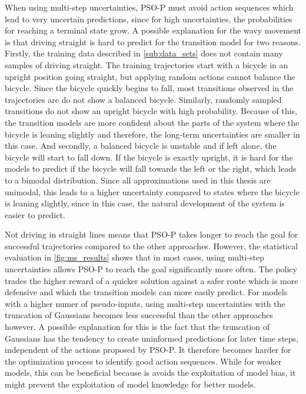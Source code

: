 When using multi-step uncertainties, PSO-P must avoid action sequences which lead to very uncertain predictions, since for high uncertainties, the probabilities for reaching a terminal state grow.
A possible explanation for the wavy movement is that driving straight is hard to predict for the transition model for two reasons.
Firstly, the training data described in \cref{sub:data_sets} does not contain many samples of driving straight.
The training trajectories start with a bicycle in an upright position going straight, but applying random actions cannot balance the bicycle.
Since the bicycle quickly begins to fall, most transitions observed in the trajectories are do not show a balanced bicycle.
Similarly, randomly sampled transitions do not show an upright bicycle with high probability.
Because of this, the transition models are more confident about the parts of the system where the bicycle is leaning slightly and therefore, the long-term uncertainties are smaller in this case.
And secondly, a balanced bicycle is unstable and if left alone, the bicycle will start to fall down.
If the bicycle is exactly upright, it is hard for the models to predict if the bicycle will fall towards the left or the right, which leads to a bimodal distribution.
Since all approximations used in this thesis are unimodal, this leads to a higher uncertainty compared to states where the bicycle is leaning slightly, since in this case, the natural development of the system is easier to predict.

Not driving in straight lines means that PSO-P takes longer to reach the goal for successful trajectories compared to the other approaches.
However, the statistical evaluation in \cref{fig:ms_results} shows that in most cases, using multi-step uncertainties allows PSO-P to reach the goal significantly more often.
The policy trades the higher reward of a quicker solution against a safer route which is more defensive and which the transition models can more easily predict.
For models with a higher numer of pseudo-inputs, using multi-step uncertainties with the truncation of Gaussians becomes less successful than the other approaches however.
A possible explanation for this is the fact that the truncation of Gaussians has the tendency to create uninformed predictions for later time steps, independent of the actions proposed by PSO-P.
It therefore becomes harder for the optimization process to identify good action sequences.
While for weaker models, this can be beneficial because is avoids the exploitation of model bias, it might prevent the exploitation of model knowledge for better models.

